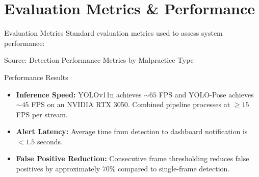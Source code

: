 \documentclass{beamer}
\begin{document}
\section{Evaluation Metrics \& Performance}
\begin{frame}{Evaluation Metrics}
Standard evaluation metrics used to assess system performance:
\begin{table}[]
\centering
{}
\end{table}
\vspace{0.3cm}
\tiny Source: Detection Performance Metrics by Malpractice Type
\end{frame}

\begin{frame}{Performance Results}
\begin{itemize}
    \item \textbf{Inference Speed:} YOLOv11n achieves $\sim65$ FPS and YOLO-Pose achieves $\sim45$ FPS on an NVIDIA RTX 3050. Combined pipeline processes at $\geq15$ FPS per stream.
    \item \textbf{Alert Latency:} Average time from detection to dashboard notification is $<1.5$ seconds.
    \item \textbf{False Positive Reduction:} Consecutive frame thresholding reduces false positives by approximately $70\%$ compared to single-frame detection.
\end{itemize}
\end{frame}

\end{document}
